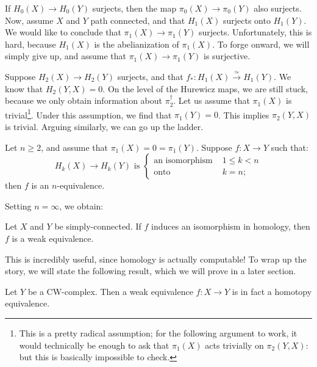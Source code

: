 If $H_0(X)\to H_0(Y)$ surjects, then the map $\pi_0(X)\to \pi_0(Y)$ also surjects.
Now, assume $X$ and $Y$ path connected,  and that $H_1(X)$ surjects onto $H_1(Y)$.
We would like to conclude that $\pi_1(X)\to\pi_1(Y)$ surjects.
Unfortunately, this is hard, because $H_1(X)$ is the abelianization of $\pi_1(X)$.
To forge onward, we will simply give up, and assume that $\pi_1(X)\to \pi_1(Y)$ is surjective.

Suppose $H_2(X)\to H_2(Y)$ surjects, and that $f_\ast:H_1(X)\xrightarrow{\simeq}H_1(Y)$.
We know that $H_2(Y,X) = 0$.
On the level of the Hurewicz maps, we are still stuck, because we only obtain information about $\pi_2^\dagger$.
Let us assume that $\pi_1(X)$ is trivial\footnote{This is a pretty radical assumption; for the following argument to work,
it would technically be enough to ask that $\pi_1(X)$ acts trivially on $\pi_2(Y,X)$: but this is basically impossible to check.}.
Under this assumption, we find that $\pi_1(Y) = 0$.
This implies $\pi_2(Y,X)$ is trivial.
Arguing similarly, we can go up the ladder.
\begin{theorem}[Whitehead]
    Let $n\geq 2$, and assume that $\pi_1(X) = 0 = \pi_1(Y)$.
    Suppose $f:X\to Y$ such that:
    \begin{equation*}
	H_k(X)\to H_k(Y) \text{ is }\begin{cases}
	    \text{an isomorphism } & 1\leq k<n\\
	    \text{onto } & k = n;
	\end{cases}
    \end{equation*}
    then $f$ is an $n$-equivalence.
\end{theorem}
Setting $n=\infty$, we obtain:
\begin{corollary}
    Let $X$ and $Y$ be simply-connected.
    If $f$ induces an isomorphism in homology, then $f$ is a weak equivalence.
\end{corollary}
This is incredibly useful, since homology is actually computable!
To wrap up the story, we will state the following result, which we will prove in a later section.
\begin{theorem}
    Let $Y$ be a CW-complex.
    Then a weak equivalence $f:X\to Y$ is in fact a homotopy equivalence.
\end{theorem}

